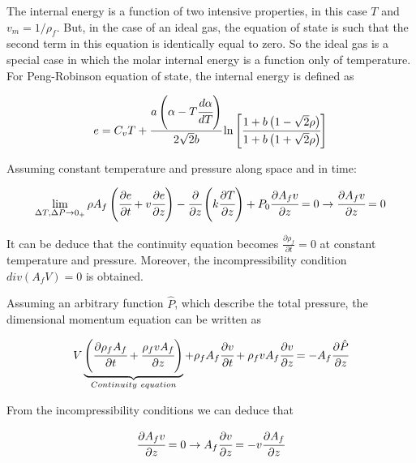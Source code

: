 \documentclass[../Article_Model_Parameters.tex]{subfiles}
\begin{document}
	The internal energy is a function of two intensive properties, in this case $T$ and $v_m=1/\rho_f$. But, in the case of an ideal gas, the equation of state is such that the second term in this equation is identically equal to zero. So the ideal gas is a special case in which the molar internal energy is a function only of temperature. For Peng-Robinson equation of state, the internal energy is defined as 
	
	{\footnotesize
	\begin{equation*}
		e = C_vT + \cfrac{a\left(\alpha -T\cfrac{d \alpha}{dT}\right)}{2\sqrt{2}b} \ln \left[ \cfrac{1+b\left(1-\sqrt{2}\rho\right) }{1+b\left(1+\sqrt{2}\rho\right)} \right]
	\end{equation*} }


	Assuming constant temperature and pressure along space and in time:
	
	{\footnotesize
		\begin{equation*}
			\lim_{\Delta T, \Delta P \rightarrow 0_+ } \rho A_f \left( \cfrac{\partial e }{\partial t} + v \cfrac{\partial e}{\partial z} \right) - \cfrac{\partial}{\partial z} \left( k \cfrac{\partial T}{\partial z} \right) + P_0 \cfrac{\partial A_f v}{\partial z} = 0 \rightarrow \cfrac{\partial A_f v}{\partial z} = 0
		\end{equation*}
	}
	
	It can be deduce that the continuity equation becomes $\frac{\partial \rho_f}{\partial t} = 0$ at constant temperature and pressure. Moreover, the incompressibility condition $div(A_fV)=0$ is obtained.
	
	Assuming an arbitrary function $\hat{P}$, which describe the total pressure, the dimensional momentum equation can be written as
	
	{\footnotesize
		\begin{equation*}
			V \underbrace{ \left( \cfrac{\partial \rho_f A_f}{\partial t} + \cfrac{\rho_f v A_f}{\partial z} \right) }_{Continuity~equation} + \rho_f A_f \cfrac{\partial v}{\partial t} + \rho_f v A_f \cfrac{\partial v}{\partial z} = - A_f \cfrac{\partial \hat{P}}{\partial z}
		\end{equation*}
	}
	
	From the incompressibility conditions we can deduce that
	
	{\footnotesize
		\begin{equation*}
			\cfrac{\partial A_f v}{\partial z} = 0 \rightarrow A_f \cfrac{\partial v}{\partial z} = - v \cfrac{\partial A_f}{\partial z}
		\end{equation*}
	}
	
\end{document}

